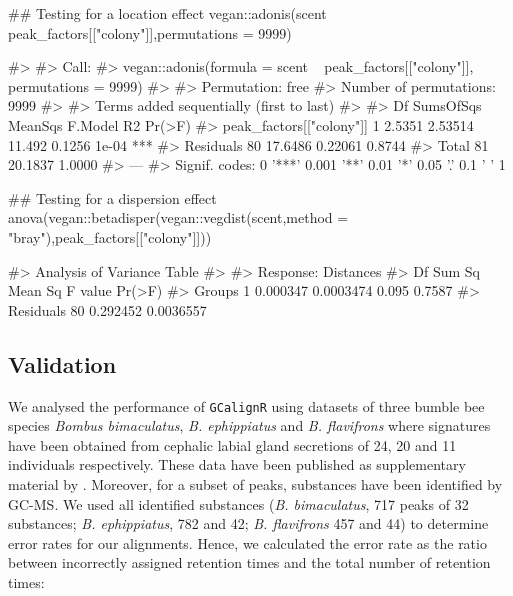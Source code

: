 \begin{Schunk}
\begin{Sinput}
## Testing for a location effect
vegan::adonis(scent ~ peak_factors[["colony"]],permutations = 9999)
\end{Sinput}
\begin{Soutput}
#> 
#> Call:
#> vegan::adonis(formula = scent ~ peak_factors[["colony"]], permutations = 9999) 
#> 
#> Permutation: free
#> Number of permutations: 9999
#> 
#> Terms added sequentially (first to last)
#> 
#>                          Df SumsOfSqs MeanSqs F.Model     R2 Pr(>F)    
#> peak_factors[["colony"]]  1    2.5351 2.53514  11.492 0.1256  1e-04 ***
#> Residuals                80   17.6486 0.22061         0.8744           
#> Total                    81   20.1837                 1.0000           
#> ---
#> Signif. codes:  0 '***' 0.001 '**' 0.01 '*' 0.05 '.' 0.1 ' ' 1
\end{Soutput}
\begin{Sinput}
## Testing for a dispersion effect
anova(vegan::betadisper(vegan::vegdist(scent,method = "bray"),peak_factors[["colony"]]))
\end{Sinput}
\begin{Soutput}
#> Analysis of Variance Table
#> 
#> Response: Distances
#>           Df   Sum Sq   Mean Sq F value Pr(>F)
#> Groups     1 0.000347 0.0003474   0.095 0.7587
#> Residuals 80 0.292452 0.0036557
\end{Soutput}
\end{Schunk}

\subsection{Validation}\label{validation}

We analysed the performance of \texttt{GCalignR} using datasets of three
bumble bee species \emph{Bombus bimaculatus}, \emph{B. ephippiatus} and
\emph{B. flavifrons} where signatures have been obtained from cephalic
labial gland secretions of 24, 20 and 11 individuals respectively. These
data have been published as supplementary material by
\citet{Dellicour.2013}. Moreover, for a subset of peaks, substances have
been identified by GC-MS. We used all identified substances (\emph{B.
bimaculatus}, 717 peaks of 32 substances; \emph{B. ephippiatus}, 782 and
42; \emph{B. flavifrons} 457 and 44) to determine error rates for our
alignments. Hence, we calculated the error rate as the ratio between
incorrectly assigned retention times and the total number of retention
times:

